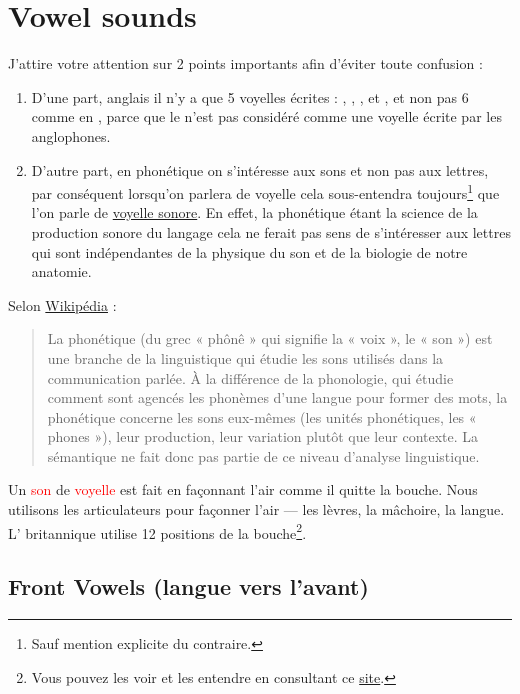 \part{Vowel sounds}\label{chap:vow}


J'attire votre attention sur 2 points importants afin d'éviter toute
confusion :
\begin{enumerate}
\item D'une part, anglais il n'y a que 5 voyelles écrites : , ,
  ,  et , et non pas 6 comme en ,
  parce que le  n'est pas  considéré comme une voyelle écrite
  par les anglophones.
\item D'autre part, en phonétique on s'intéresse aux sons et non pas aux
  lettres, par conséquent lorsqu'on parlera de voyelle cela
  sous-entendra toujours\footnote{Sauf mention explicite du
    contraire.} que l'on parle de \underline{voyelle sonore}. En
  effet, la phonétique étant la science de la production sonore du
  langage cela ne ferait pas sens de s'intéresser aux lettres qui sont
  indépendantes de la physique du son et de la biologie de notre anatomie.
\end{enumerate}
Selon \href{https://fr.wikipedia.org/wiki/Phon\%C3\%A9tique}{Wikipédia} :
\begin{quote}
  La phonétique (du grec « phônê » qui signifie la « voix », le « son ») est une branche de la linguistique qui étudie les sons utilisés dans la communication parlée. À la différence de la phonologie, qui étudie comment sont agencés les phonèmes d'une langue pour former des mots, la phonétique concerne les sons eux-mêmes (les unités phonétiques, les « phones »), leur production, leur variation plutôt que leur contexte. La sémantique ne fait donc pas partie de ce niveau d'analyse linguistique.
\end{quote}

Un \textcolor{red}{son} de \textcolor{red}{voyelle}
est fait en façonnant l'air comme il quitte la
bouche. Nous utilisons les articulateurs pour façonner l'air --- les
lèvres, la mâchoire, la langue. L' britannique utilise
12 positions de la bouche\footnote{Vous pouvez les voir et les
  entendre en consultant ce \href{https://pronunciationstudio.com/vowel02/}{site}.}.  


\chapter{Front Vowels (langue vers l'avant)}\label{chap:frontvow}

